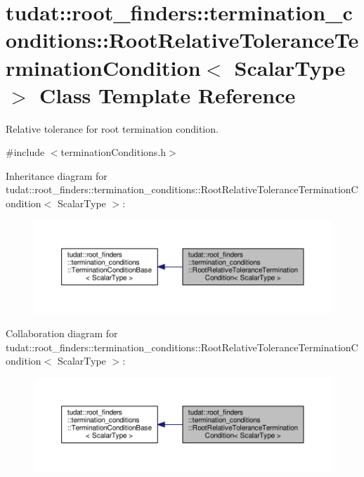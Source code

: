 \hypertarget{classtudat_1_1root__finders_1_1termination__conditions_1_1RootRelativeToleranceTerminationCondition}{}\section{tudat\+:\+:root\+\_\+finders\+:\+:termination\+\_\+conditions\+:\+:Root\+Relative\+Tolerance\+Termination\+Condition$<$ Scalar\+Type $>$ Class Template Reference}
\label{classtudat_1_1root__finders_1_1termination__conditions_1_1RootRelativeToleranceTerminationCondition}


Relative tolerance for root termination condition.  




{\ttfamily \#include $<$termination\+Conditions.\+h$>$}



Inheritance diagram for tudat\+:\+:root\+\_\+finders\+:\+:termination\+\_\+conditions\+:\+:Root\+Relative\+Tolerance\+Termination\+Condition$<$ Scalar\+Type $>$\+:
\nopagebreak
\begin{figure}[H]
\begin{center}
\leavevmode
\includegraphics[width=350pt]{classtudat_1_1root__finders_1_1termination__conditions_1_1RootRelativeToleranceTerminationCondition__inherit__graph}
\end{center}
\end{figure}


Collaboration diagram for tudat\+:\+:root\+\_\+finders\+:\+:termination\+\_\+conditions\+:\+:Root\+Relative\+Tolerance\+Termination\+Condition$<$ Scalar\+Type $>$\+:
\nopagebreak
\begin{figure}[H]
\begin{center}
\leavevmode
\includegraphics[width=350pt]{classtudat_1_1root__finders_1_1termination__conditions_1_1RootRelativeToleranceTerminationCondition__coll__graph}
\end{center}
\end{figure}
